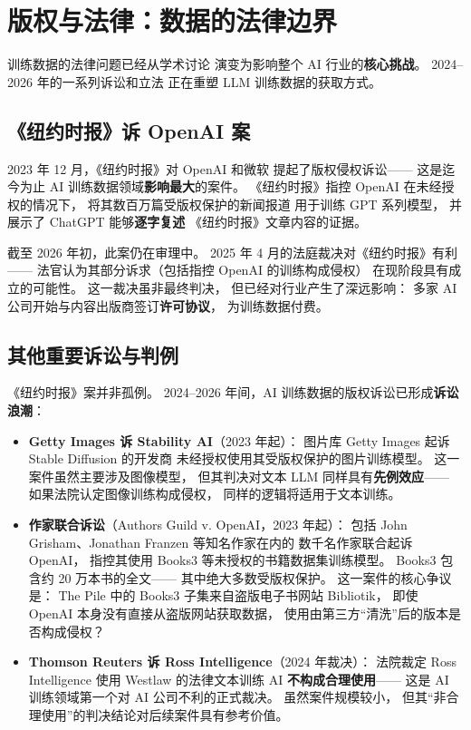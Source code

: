 \section{版权与法律：数据的法律边界}

训练数据的法律问题已经从学术讨论
演变为影响整个 AI 行业的\textbf{核心挑战}。
2024--2026 年的一系列诉讼和立法
正在重塑 LLM 训练数据的获取方式。

\subsection{《纽约时报》诉 OpenAI 案}

2023 年 12 月，《纽约时报》对 OpenAI 和微软
提起了版权侵权诉讼——
这是迄今为止 AI 训练数据领域\textbf{影响最大}的案件。
《纽约时报》指控 OpenAI 在未经授权的情况下，
将其数百万篇受版权保护的新闻报道
用于训练 GPT 系列模型，
并展示了 ChatGPT 能够\textbf{逐字复述}
《纽约时报》文章内容的证据。

截至 2026 年初，此案仍在审理中。
2025 年 4 月的法庭裁决对《纽约时报》有利——
法官认为其部分诉求（包括指控 OpenAI 的训练构成侵权）
在现阶段具有成立的可能性。
这一裁决虽非最终判决，
但已经对行业产生了深远影响：
多家 AI 公司开始与内容出版商签订\textbf{许可协议}，
为训练数据付费。

\subsection{其他重要诉讼与判例}

《纽约时报》案并非孤例。
2024--2026 年间，AI 训练数据的版权诉讼已形成\textbf{诉讼浪潮}：

\begin{itemize}[noitemsep]
  \item \textbf{Getty Images 诉 Stability AI}（2023 年起）：
        图片库 Getty Images 起诉 Stable Diffusion 的开发商
        未经授权使用其受版权保护的图片训练模型。
        这一案件虽然主要涉及图像模型，
        但其判决对文本 LLM 同样具有\textbf{先例效应}——
        如果法院认定图像训练构成侵权，
        同样的逻辑将适用于文本训练。
  \item \textbf{作家联合诉讼}（Authors Guild v. OpenAI，2023 年起）：
        包括 John Grisham、Jonathan Franzen 等知名作家在内的
        数千名作家联合起诉 OpenAI，
        指控其使用 Books3 等未授权的书籍数据集训练模型。
        Books3 包含约 20 万本书的全文——
        其中绝大多数受版权保护。
        这一案件的核心争议是：
        The Pile 中的 Books3 子集来自盗版电子书网站 Bibliotik，
        即使 OpenAI 本身没有直接从盗版网站获取数据，
        使用由第三方``清洗''后的版本是否构成侵权？
  \item \textbf{Thomson Reuters 诉 Ross Intelligence}（2024 年裁决）：
        法院裁定 Ross Intelligence 使用 Westlaw 的法律文本训练 AI
        \textbf{不构成合理使用}——
        这是 AI 训练领域第一个对 AI 公司不利的正式裁决。
        虽然案件规模较小，
        但其``非合理使用''的判决结论对后续案件具有参考价值。
\end{itemize}

